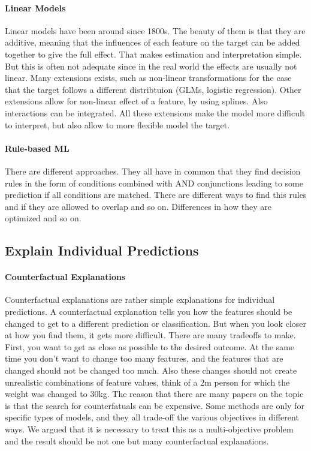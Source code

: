 \documentclass[runningheads]{llncs}
\begin{document}
\paragraph{Linear Models}
Linear models have been around since 1800s.
The beauty of them is that they are additive, meaning that the influences of each feature on the target can be added together to give the full effect.
That makes estimation and interpretation simple.
But this is often not adequate since in the real world the effects are usually not linear.
Many extensions exists, such as non-linear transformations for the case that the target follows a different distribtuion (GLMs, logistic regression).
Other extensions allow for non-linear effect of a feature, by using splines.
Also interactions can be integrated.
All these extensions make the model more difficult to interpret, but also allow to more flexible model the target.

\paragraph{Rule-based ML}
There are different approaches.
They all have in common that they find decision rules in the form of conditions combined with AND conjunctions leading to some prediction if all conditions are matched.
There are different ways to find this rules and if they are allowed to overlap and so on.
Differences in how they are optimized and so on.

\subsection{Explain Individual Predictions}

\paragraph{Counterfactual Explanations}
Counterfactual explanations are rather simple explanations for individual predictions.
A counterfactual explanation tells you how the features should be changed to get to a different prediction or classification.
But when you look closer at how you find them, it gets more difficult.
There are many tradeoffs to make.
First, you want to get as close as possible to the desired outcome.
At the same time you don't want to change too many features, and the features that are changed should not be changed too much.
Also these changes should not create unrealistic combinations of feature values, think of a 2m person for which the weight was changed to 30kg.
The reason that there are many papers on the topic is that the search for counterfatuals can be expensive.
Some methods are only for specific types of models, and they all trade-off the various objectives in different ways.
We argued that it is necessary to treat this as a multi-objective problem and the result should be not one but many counterfactual explanations.
\end{document}
